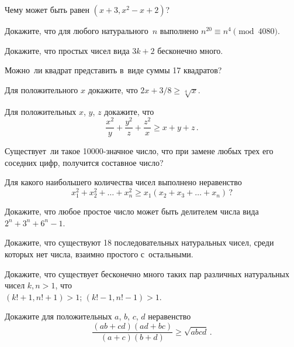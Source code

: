 


\begin{problems}

\item
Чему может быть равен $(x + 3, x^2 - x + 2)$?

\item
Докажите, что для любого натурального~$n$ выполнено
$n^{20} \equiv n^{4} \pmod{4080}$.

\item
Докажите, что простых чисел вида $3 k + 2$ бесконечно много.

\item
Можно~ли квадрат представить в~виде суммы 17 квадратов?

\item
Для положительного $x$ докажите, что $2 x + 3 / 8 \geq \sqrt[4]{x}$.

\item
Для положительных $x$, $y$, $z$ докажите, что
\[
    \frac{x^2}{y} + \frac{y^2}{z} + \frac{z^2}{x} \geq x + y + z
\, . \]

\item
Существует~ли такое 10000-значное число, что при замене любых трех его соседних
цифр, получится составное число?

\item
Для какого наибольшего количества чисел выполнено неравенство
\[
    x_{1}^2 + x_{2}^2 + \ldots + x_{n}^2
\geq
    x_{1} (x_{2} + x_{3} + \ldots + x_{n})
\, ? \]

\item
Докажите, что любое простое число может быть делителем числа вида
$2^n + 3^n + 6^n - 1$.

\item
Докажите, что существуют 18 последовательных натуральных чисел, среди которых
нет числа, взаимно простого с~остальными.

\item
Докажите, что существует бесконечно много таких пар различных натуральных чисел
$k, n > 1$, что
\\
\subproblem $(k! + 1, n! + 1) > 1$;
\qquad
\subproblem $(k! - 1, n! - 1) > 1$.

\item
Докажите для положительных $a$, $b$, $c$, $d$ неравенство
\[
    \frac{(a b + c d) (a d + b c)}{(a + c) (b + d)}
\geq
    \sqrt{abcd}
\, . \]

\end{problems}

